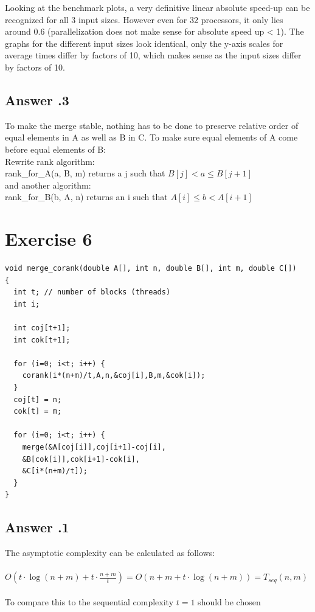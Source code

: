 \documentclass[a4paper,%
11pt,%
DIV=12,
headsepline,%
headings=normal,
]{scrartcl}
\newcounter{curex}
\newcommand{\exercise}[1]{\section*{Exercise #1}\setcounter{curex}{#1}}
\newcommand{\answer}[1]{\subsection*{Answer \arabic{curex}.#1}}
\begin{document}
\noindent
Looking at the benchmark plots, a very definitive linear absolute speed-up can be recognized for all 3 input sizes. However even for 32 processors, it only lies around 0.6 (parallelization does not make sense for absolute speed up < 1). The graphs for the different input sizes look identical, only the y-axis scales for average times differ by factors of 10, which makes sense as the input sizes differ by factors of 10.

\answer{3}
To make the merge stable, nothing has to be done to preserve relative order of equal elements in A as well as B in C.
To make sure equal elements of A come before equal elements of B: \\
Rewrite rank algorithm:\\
rank{\_}for{\_}A(a, B, m) returns a j such that $B[j] < a \leq B[j + 1]$ \\
and another algorithm: \\
rank{\_}for{\_}B(b, A, n) returns an i such that $A[i] \leq b < A[i + 1]$

\newpage
\exercise{6}
\begin{minipage}[t]{1.0\linewidth}
\begin{lstlisting}
void merge_corank(double A[], int n, double B[], int m, double C[])
{
  int t; // number of blocks (threads)
  int i;
  
  int coj[t+1];
  int cok[t+1];
  
  for (i=0; i<t; i++) {
    corank(i*(n+m)/t,A,n,&coj[i],B,m,&cok[i]);
  }
  coj[t] = n;
  cok[t] = m;
  
  for (i=0; i<t; i++) {
    merge(&A[coj[i]],coj[i+1]-coj[i],
    &B[cok[i]],cok[i+1]-cok[i],
    &C[i*(n+m)/t]);
  }
}
\end{lstlisting}
\end{minipage}

\answer{1}
The asymptotic complexity can be calculated as follows:\\
\\
$O\left(t \cdot \log(n+m) + t \cdot \frac{n+m}{t} \right) = O(n + m + t \cdot \log(n+m)) = T_{seq}(n,m)$
\\
\\
To compare this to the sequential complexity $t=1$ should be chosen  
\end{document}
